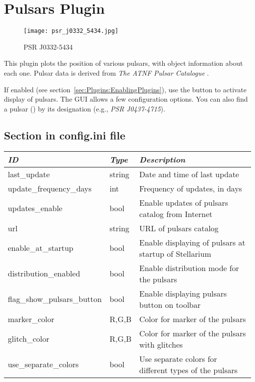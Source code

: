 \newpage

\section{Pulsars Plugin}
\label{sec:plugins:Pulsars}

\begin{figure}[ht]
\texttt{[image: psr\_j0332\_5434.jpg]}
\caption{PSR J0332-5434}
\label{fig:plugin:Pulsars}
\end{figure}

\noindent This plugin plots the position of various pulsars, with object
information about each one. Pulsar data is derived from \textit{The
  ATNF Pulsar Catalogue} \cite{2005AJ....129.1993M}.

If enabled (see section~\ref{sec:Plugins:EnablingPlugins}), use the
 button to activate display of
pulsars. The GUI allows a few configuration options.  You can also
find a pulsar () by its designation (e.g., \emph{PSR
  J0437-4715}).



\subsection{Section  in config.ini file}
\label{sec:plugins:Pulsars:config}

\begin{tabularx}{\textwidth}{l|l|X}\toprule
\emph{ID}               & \emph{Type} & \emph{Description}\\\midrule
last\_update                & string & Date and time of last update\\\midrule
update\_frequency\_days     & int    & Frequency of updates, in days\\\midrule
updates\_enable             & bool   & Enable updates of pulsars catalog from Internet \\\midrule
url                         & string & URL of pulsars catalog \\\midrule
enable\_at\_startup         & bool   & Enable displaying of pulsars at startup of Stellarium \\\midrule
distribution\_enabled       & bool   & Enable distribution mode for the pulsars \\\midrule
flag\_show\_pulsars\_button & bool   & Enable displaying pulsars button on toolbar \\\midrule
marker\_color               & R,G,B  & Color for marker of the pulsars \\\midrule
glitch\_color               & R,G,B  & Color for marker of the pulsars with glitches \\\midrule
use\_separate\_colors       & bool   & Use separate colors for different types of the pulsars \\\bottomrule
\end{tabularx}

